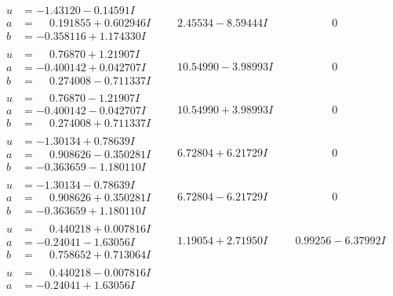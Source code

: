 \documentclass[1p]{elsarticle_modified}
\theoremstyle{definition}
\begin{document}
$$\begin{array}{c|c|c}
\begin{aligned}
u &= -1.43120 - 0.14591 I \\
a &= \phantom{-}0.191855 + 0.602946 I \\
b &= -0.358116 + 1.174330 I\end{aligned}
 & \phantom{-}2.45534 - 8.59444 I & \phantom{-0.000000 } 0 \\ \hline\begin{aligned}
u &= \phantom{-}0.76870 + 1.21907 I \\
a &= -0.400142 + 0.042707 I \\
b &= \phantom{-}0.274008 - 0.711337 I\end{aligned}
 & \phantom{-}10.54990 - 3.98993 I & \phantom{-0.000000 } 0 \\ \hline\begin{aligned}
u &= \phantom{-}0.76870 - 1.21907 I \\
a &= -0.400142 - 0.042707 I \\
b &= \phantom{-}0.274008 + 0.711337 I\end{aligned}
 & \phantom{-}10.54990 + 3.98993 I & \phantom{-0.000000 } 0 \\ \hline\begin{aligned}
u &= -1.30134 + 0.78639 I \\
a &= \phantom{-}0.908626 - 0.350281 I \\
b &= -0.363659 - 1.180110 I\end{aligned}
 & \phantom{-}6.72804 + 6.21729 I & \phantom{-0.000000 } 0 \\ \hline\begin{aligned}
u &= -1.30134 - 0.78639 I \\
a &= \phantom{-}0.908626 + 0.350281 I \\
b &= -0.363659 + 1.180110 I\end{aligned}
 & \phantom{-}6.72804 - 6.21729 I & \phantom{-0.000000 } 0 \\ \hline\begin{aligned}
u &= \phantom{-}0.440218 + 0.007816 I \\
a &= -0.24041 - 1.63056 I \\
b &= \phantom{-}0.758652 + 0.713064 I\end{aligned}
 & \phantom{-}1.19054 + 2.71950 I & \phantom{-}0.99256 - 6.37992 I \\ \hline\begin{aligned}
u &= \phantom{-}0.440218 - 0.007816 I \\
a &= -0.24041 + 1.63056 I \\

\end{aligned}
\end{array}$$
\end{document}
